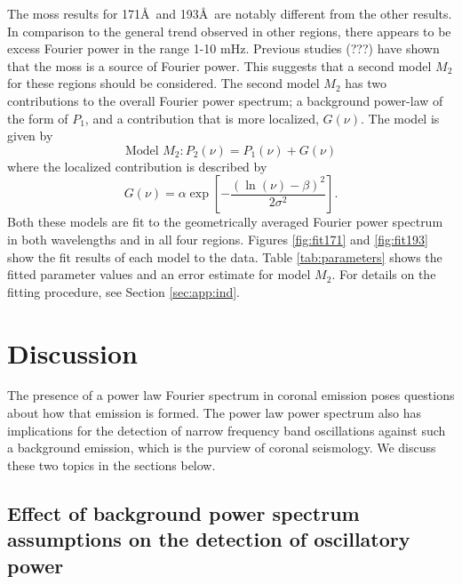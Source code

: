\documentclass[preprint]{../aastex52/aastex}
\newcommand{\PS}{power spectrum}
\newcommand{\Fps}{Fourier \PS}
\begin{document}
The moss results for 171\AA\ and 193\AA\ are notably different from
the other results.  In comparison to the general trend observed in
other regions, there appears to be excess Fourier power in the range
1-10 mHz.  Previous studies (???) have shown that the moss is a source
of Fourier power.  This suggests that a second model $M_{2}$ for these
regions should be considered.  The second model $M_{2}$ has two
contributions to the overall \Fps; a background power-law of the form
of $P_{1}$, and a contribution that is more localized, $G(\nu)$.  The
model is given by
\begin{equation}
\label{eq:pwrlawbump}
\mbox{Model $M_{2}$}: P_{2}(\nu) = P_{1}(\nu) + G(\nu)
\end{equation}
where the localized contribution is described by
\begin{equation}
\label{eqn:bump}
G(\nu) = \alpha\exp\left[-\frac{(\ln(\nu)-\beta)^{2}}{2\sigma^{2}}\right].
\end{equation}
Both these models are fit to the geometrically averaged Fourier power
spectrum in both wavelengths and in all four regions.  Figures
\ref{fig:fit171} and \ref{fig:fit193} show the fit results of
each model to the data.  Table \ref{tab:parameters} shows the fitted
parameter values and an error estimate for model $M_{2}$.  For details
on the fitting procedure, see Section \ref{sec:app:ind}.

\section{Discussion}
The presence of a power law Fourier spectrum in coronal emission poses
questions about how that emission is formed.  The power law power
spectrum also has implications for the detection of narrow frequency
band oscillations against such a background emission, which is the
purview of coronal seismology.  We discuss these two topics in the
sections below.


\subsection{Effect of background power spectrum assumptions on the
  detection of oscillatory power}
\label{ssec:corseis}
\end{document}
